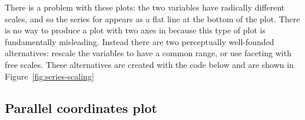 There is a problem with these plots: the two variables have radically different scales, and so the series for  appears as a flat line at the bottom of the plot. There is no way to produce a plot with two axes in \ggplot because this type of plot is fundamentally misleading. Instead there are two perceptually well-founded alternatives: rescale the variables to have a common range, or use faceting with free scales. These alternatives are created with the code below and are shown in Figure~\ref{fig:series-scaling}

% 


\subsection{Parallel coordinates plot} 
\label{sub:molten_data}

